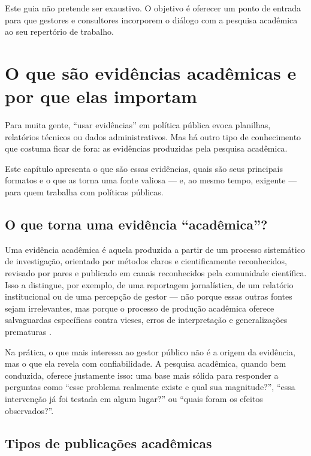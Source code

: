 \documentclass[12pt, a4paper, openany]{book}
\begin{document}
Este guia não pretende ser exaustivo. O objetivo é oferecer um ponto de entrada para que gestores e consultores incorporem o diálogo com a pesquisa acadêmica ao seu repertório de trabalho.

\chapter{O que são evidências acadêmicas e por que elas importam}\label{cap1}

Para muita gente, ``usar evidências'' em política pública evoca planilhas, relatórios técnicos ou dados administrativos. Mas há outro tipo de conhecimento que costuma ficar de fora: as evidências produzidas pela pesquisa acadêmica.

Este capítulo apresenta o que são essas evidências, quais são seus principais
formatos e o que as torna uma fonte valiosa --- e, ao mesmo tempo, exigente ---
para quem trabalha com políticas públicas.

\section{O que torna uma evidência ``acadêmica''?}

Uma evidência acadêmica é aquela produzida a partir de um processo sistemático
de investigação, orientado por métodos claros e cientificamente reconhecidos,
revisado por pares e publicado em canais reconhecidos pela comunidade
científica. Isso a distingue, por exemplo, de uma reportagem jornalística, de
um relatório institucional ou de uma percepção de gestor --- não porque essas
outras fontes sejam irrelevantes, mas porque o processo de produção acadêmica
oferece salvaguardas específicas contra vieses, erros de interpretação e
generalizações prematuras \citep{Gough2012}.

Na prática, o que mais interessa ao gestor público não é a origem da evidência,
mas o que ela revela com confiabilidade. A pesquisa acadêmica, quando bem
conduzida, oferece justamente isso: uma base mais sólida para responder a
perguntas como ``esse problema realmente existe e qual sua magnitude?'',
``essa intervenção já foi testada em algum lugar?'' ou ``quais foram os
efeitos observados?''.

\section{Tipos de publicações acadêmicas}
\end{document}
